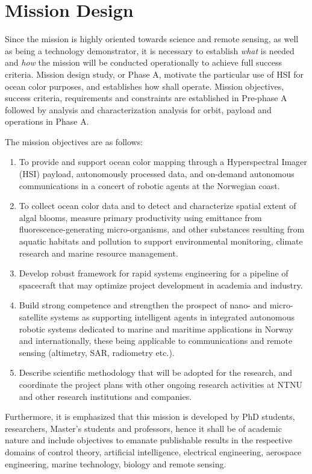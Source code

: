 \section{Mission Design} \label{missiondesign}
Since the mission is highly oriented towards science and remote sensing, as well as being a technology demonstrator, it is necessary to establish \emph{what} is needed and \emph{how} the mission will be conducted operationally to achieve full success criteria. Mission design study, or Phase A, motivate the particular use of HSI for ocean color purposes, and establishes how \hypso shall operate. Mission objectives, success criteria, requirements and constraints are established in Pre-phase A followed by analysis and characterization analysis for orbit, payload and operations in Phase A.

The \hypso mission objectives are as follows:
\begin{enumerate}
\item To provide and support ocean color mapping through a Hyperspectral Imager (HSI) payload, autonomously processed data, and on-demand autonomous communications in a concert of robotic agents at the Norwegian coast.
\item To collect ocean color data and to detect and characterize spatial extent of algal blooms, measure primary productivity using emittance from fluorescence-generating micro-organisms, and other substances resulting from aquatic habitats and pollution to support environmental monitoring, climate research and marine resource management.
\item Develop robust framework for rapid systems engineering for a pipeline of spacecraft that may optimize project development in academia and industry.
\item Build strong competence and strengthen the prospect of nano- and micro-satellite systems as supporting intelligent agents in integrated autonomous robotic systems dedicated to marine and maritime applications in Norway and internationally, these being applicable to communications and remote sensing (altimetry, SAR, radiometry etc.).
\item Describe scientific methodology that will be adopted for the research, and coordinate the project plans with other ongoing research activities at NTNU and other research institutions and companies.
\end{enumerate}

Furthermore, it is emphasized that this mission is developed by PhD students, researchers, Master's students and professors, hence it shall be of academic nature and include objectives to emanate publishable results in the respective domains of control theory, artificial intelligence, electrical engineering, aerospace engineering, marine technology, biology and remote sensing. 

